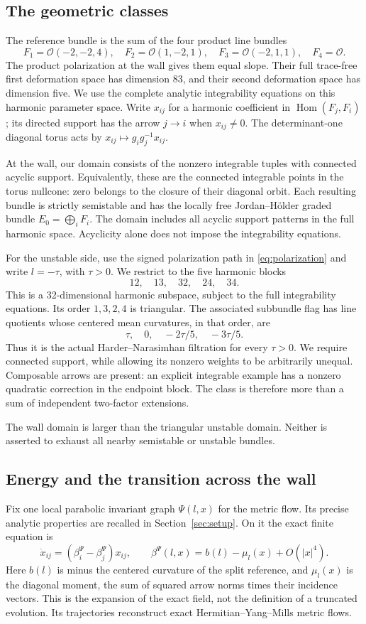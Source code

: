 \documentclass[11pt]{amsart}
\theoremstyle{definition}
\theoremstyle{remark}
\newcommand{\cO}{\mathcal O}
\newcommand{\Hom}{\operatorname{Hom}}
\begin{document}
\subsection{The geometric classes}
The reference bundle is the sum of the four product line bundles
\[
 F_1=\cO(-2,-2,4),\quad F_2=\cO(1,-2,1),\quad
 F_3=\cO(-2,1,1),\quad F_4=\cO .
\]
The product polarization at the wall gives them equal slope.
Their full trace-free first deformation space has dimension
83, and their second deformation space has dimension five.
We use the complete analytic integrability equations on this
harmonic parameter space. Write $x_{ij}$ for a harmonic
coefficient in $\Hom(F_j,F_i)$; its directed support has the
arrow $j\to i$ when $x_{ij}\ne0$. The determinant-one diagonal
torus acts by $x_{ij}\mapsto g_i g_j^{-1}x_{ij}$.

At the wall, our domain consists of the nonzero integrable
tuples with connected acyclic support. Equivalently, these
are the connected integrable points in the torus nullcone:
zero belongs to the closure of their diagonal orbit.
Each resulting bundle is strictly semistable and has the
locally free Jordan--Hölder graded bundle
$E_0=\bigoplus_iF_i$. The domain includes all acyclic support
patterns in the full harmonic space. Acyclicity alone does
not impose the integrability equations.

For the unstable side, use the signed polarization path in
\eqref{eq:polarization} and write $l=-\tau$, with $\tau>0$.
We restrict to the five harmonic blocks
\[
 12,\quad13,\quad32,\quad24,\quad34 .
\]
This is a 32-dimensional harmonic subspace, subject to the
full integrability equations. Its order $1,3,2,4$ is
triangular. The associated subbundle flag has line quotients
whose centered mean curvatures, in that order, are
\[
 \tau,\quad0,\quad-2\tau/5,\quad-3\tau/5 .
\]
Thus it is the actual Harder--Narasimhan filtration for every
$\tau>0$. We require connected support, while allowing its
nonzero weights to be arbitrarily unequal. Composable arrows
are present: an explicit integrable example has a nonzero
quadratic correction in the endpoint block. The class is
therefore more than a sum of independent two-factor extensions.

The wall domain is larger than the triangular unstable domain.
Neither is asserted to exhaust all nearby semistable or
unstable bundles.

\subsection{Energy and the transition across the wall}
Fix one local parabolic invariant graph $\Psi(l,x)$ for the
metric flow. Its precise analytic properties are recalled
in Section~\ref{sec:setup}. On it the exact finite equation is
\[
 \dot x_{ij}=(\beta_i^\Psi-\beta_j^\Psi)x_{ij},\qquad
 \beta^\Psi(l,x)=b(l)-\mu_l(x)+O(|x|^4).
\]
Here $b(l)$ is minus the centered curvature of the split
reference, and $\mu_l(x)$ is the diagonal moment, the sum
of squared arrow norms times their incidence vectors.
This is the expansion of the exact field, not the definition
of a truncated evolution. Its trajectories reconstruct exact
Hermitian--Yang--Mills metric flows.
\end{document}
